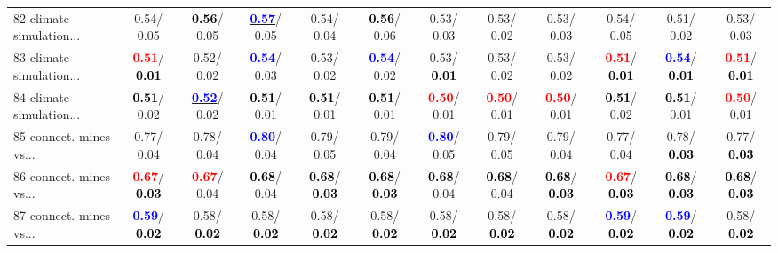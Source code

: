 \begin{table}[h]
\begin{center}
{\begin{tabular}{lc|c|c|c|c|c|c|c|c|c|c}
82-climate simulation... &   0.54/  0.05 & \textcolor{black}{\textbf{  0.56}}/  0.05 & \underline{\textcolor{blue}{\textbf{  0.57}}}/  0.05 &   0.54/  0.04 & \textcolor{black}{\textbf{  0.56}}/  0.06 &   0.53/  0.03 &   0.53/  0.02 &   0.53/  0.03 &   0.54/  0.05 &   0.51/  0.02 &   0.53/  0.03 \\
83-climate simulation... & \textcolor{red}{\textbf{  0.51}}/\textcolor{black}{\textbf{  0.01}} &   0.52/  0.02 & \textcolor{blue}{\textbf{  0.54}}/  0.03 &   0.53/  0.02 & \textcolor{blue}{\textbf{  0.54}}/  0.02 &   0.53/\textcolor{black}{\textbf{  0.01}} &   0.53/  0.02 &   0.53/  0.02 & \textcolor{red}{\textbf{  0.51}}/\textcolor{black}{\textbf{  0.01}} & \textcolor{blue}{\textbf{  0.54}}/\textcolor{black}{\textbf{  0.01}} & \textcolor{red}{\textbf{  0.51}}/\textcolor{black}{\textbf{  0.01}} \\
84-climate simulation... & \textcolor{black}{\textbf{  0.51}}/  0.02 & \underline{\textcolor{blue}{\textbf{  0.52}}}/  0.02 & \textcolor{black}{\textbf{  0.51}}/  0.01 & \textcolor{black}{\textbf{  0.51}}/  0.01 & \textcolor{black}{\textbf{  0.51}}/  0.01 & \textcolor{red}{\textbf{  0.50}}/  0.01 & \textcolor{red}{\textbf{  0.50}}/  0.01 & \textcolor{red}{\textbf{  0.50}}/  0.01 & \textcolor{black}{\textbf{  0.51}}/  0.02 & \textcolor{black}{\textbf{  0.51}}/  0.01 & \textcolor{red}{\textbf{  0.50}}/  0.01 \\
85-connect. mines vs... &   0.77/  0.04 &   0.78/  0.04 & \textcolor{blue}{\textbf{  0.80}}/  0.04 &   0.79/  0.05 &   0.79/  0.04 & \textcolor{blue}{\textbf{  0.80}}/  0.05 &   0.79/  0.05 &   0.79/  0.04 &   0.77/  0.04 &   0.78/\textcolor{black}{\textbf{  0.03}} &   0.77/\textcolor{black}{\textbf{  0.03}} \\ \hline
86-connect. mines vs... & \textcolor{red}{\textbf{  0.67}}/\textcolor{black}{\textbf{  0.03}} & \textcolor{red}{\textbf{  0.67}}/  0.04 & \textcolor{black}{\textbf{  0.68}}/  0.04 & \textcolor{black}{\textbf{  0.68}}/\textcolor{black}{\textbf{  0.03}} & \textcolor{black}{\textbf{  0.68}}/\textcolor{black}{\textbf{  0.03}} & \textcolor{black}{\textbf{  0.68}}/  0.04 & \textcolor{black}{\textbf{  0.68}}/  0.04 & \textcolor{black}{\textbf{  0.68}}/\textcolor{black}{\textbf{  0.03}} & \textcolor{red}{\textbf{  0.67}}/\textcolor{black}{\textbf{  0.03}} & \textcolor{black}{\textbf{  0.68}}/\textcolor{black}{\textbf{  0.03}} & \textcolor{black}{\textbf{  0.68}}/\textcolor{black}{\textbf{  0.03}} \\
87-connect. mines vs... & \textcolor{blue}{\textbf{  0.59}}/\textcolor{black}{\textbf{  0.02}} &   0.58/\textcolor{black}{\textbf{  0.02}} &   0.58/\textcolor{black}{\textbf{  0.02}} &   0.58/\textcolor{black}{\textbf{  0.02}} &   0.58/\textcolor{black}{\textbf{  0.02}} &   0.58/\textcolor{black}{\textbf{  0.02}} &   0.58/\textcolor{black}{\textbf{  0.02}} &   0.58/\textcolor{black}{\textbf{  0.02}} & \textcolor{blue}{\textbf{  0.59}}/\textcolor{black}{\textbf{  0.02}} & \textcolor{blue}{\textbf{  0.59}}/\textcolor{black}{\textbf{  0.02}} &   0.58/\textcolor{black}{\textbf{  0.02}} \\

\end{tabular}}
\end{center}
\end{table}
